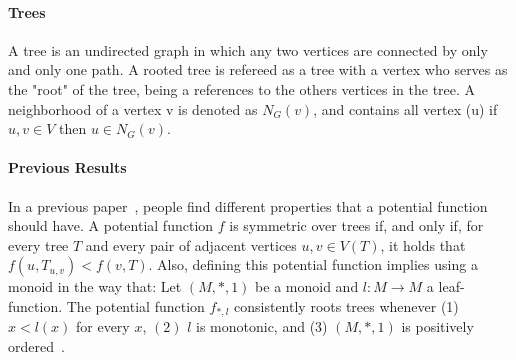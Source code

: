 \paragraph{Trees} A tree is an undirected graph in which any two vertices are connected by only and only one path. A rooted tree is refereed as a tree with a vertex who serves as the "root" of the tree, being a references to the others  vertices in the tree. A neighborhood of a vertex v is denoted as $N_{G}(v)$, and contains all vertex (u) if ${u,v} \in V$ then $u \in N_{G}(v)$.

\paragraph{Previous Results} In a previous paper~\cite{RiverosSS23}, people find different properties that a potential function should have. A potential function $f$ is
symmetric over trees if, and only if, for every tree $T$ and every pair of adjacent vertices $u, v \in V(T)$, it holds that $f(u, T_{u,v}) < f(v, T)$. Also, defining this potential function implies using a monoid in the way that: Let $(M, \ast, 1)$ be a monoid and $l : M \rightarrow M$ a leaf-function. The potential function $f_{\ast,l}$ consistently roots trees whenever (1) $x < l(x)$ for every $x$, $(2)$ $l$ is monotonic, and (3) $(M, \ast, 1)$ is positively ordered~\cite{RiverosSS23}.


